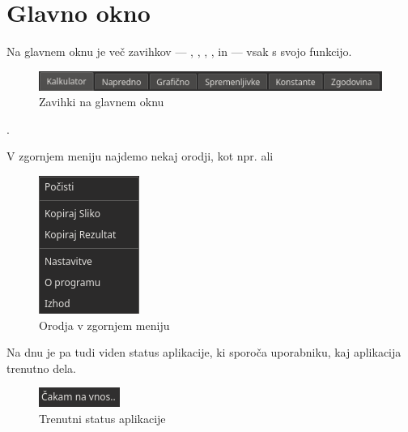 \documentclass[12pt,titlepage]{report}
\begin{document}
	\section{Glavno okno}
	\label{mainwindow}
		\parbox{\textwidth}{
		Na glavnem oknu je več zavihkov ---
		, , , ,  in 
		--- vsak s svojo funkcijo.
		\begin{figure}[H]
			\centering
			\includegraphics{mw_tabs.png}
			\caption{Zavihki na glavnem oknu}
			\label{fig:mw_tabs}
		\end{figure}.}
		\parbox{\textwidth}{
		V zgornjem meniju najdemo nekaj orodji, kot npr.  ali 
		\begin{figure}[H]
			\centering
			\includegraphics{tools.png}
			\caption{Orodja v zgornjem meniju}
			\label{fig:tools}
		\end{figure}}
		\parbox{\textwidth}{
		Na dnu je pa tudi viden status aplikacije, ki sporoča uporabniku, kaj aplikacija trenutno dela.
		\begin{figure}[H]
			\centering
			\includegraphics{mw_status.png}
			\caption{Trenutni status aplikacije}
			\label{fig:mw_status}
		\end{figure}}
\end{document}
